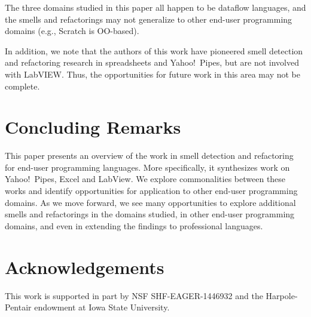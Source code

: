 \documentclass{sig-alternate}
\begin{document}
The three domains studied in this paper all happen to be dataflow languages, and the smells and refactorings may not generalize to other end-user programming domains (e.g., Scratch is OO-based). 

In addition, we note that the authors of this work have pioneered smell detection and refactoring research in spreadsheets and Yahoo!\ Pipes, but are not involved with LabVIEW. Thus, the opportunities for future work in this area may not be complete.  

\section{Concluding Remarks}
\label{sec:conclusions}
This paper presents an overview of the work in smell detection and refactoring for end-user programming languages. More specifically, it synthesizes work on Yahoo!\ Pipes, Excel and LabView. We explore commonalities between these works and identify opportunities for application to other end-user programming domains. As we move forward, we see many opportunities to explore additional smells and refactorings in the domains studied, in other end-user programming domains, and even in extending the findings to professional languages. 

\balance

\section*{Acknowledgements}
This work is supported in part by  NSF SHF-EAGER-1446932 and the Harpole-Pentair endowment at Iowa State University.




\end{document}
